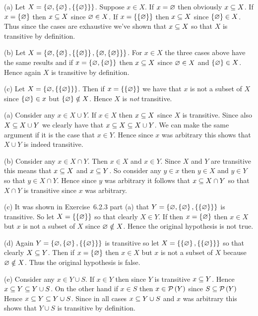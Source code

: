 
\begin{solution}
	(a) Let $X = \braces{\es, \braces{\es}, \braces{\braces{\es}}}$.
    Suppose $x \in X$.
    If $x = \es$ then obviously $x \ss X$.
    If $x = \braces{\es}$ then $x \ss X$ since $\es \in X$.
    If $x  = \braces{\braces{\es}}$ then $x \ss X$ since $\braces{\es} \in X$.
    Thus since the cases are exhaustive we've shown that $x \ss X$ so that $X$ is transitive by definition. \qedsymbol

    (b) Let $X = \braces{\es, \braces{\es}, \braces{\braces{\es}}, \braces{\es, \braces{\es}}}$.
    For $x \in X$ the three cases above have the same results and if $x = \braces{\es, \braces{\es}}$ then $x \ss X$ since $\es \in X$ and $\braces{\es} \in X$.
    Hence again $X$ is transitive by definition. \qedsymbol

    (c) Let $X = \braces{\es, \braces{\braces{\es}}}$.
    Then if $x = \braces{\braces{\es}}$ we have that $x$ is not a subset of $X$ since $\braces{\es} \in x$ but $\braces{\es} \notin X$.
    Hence $X$ is \emph{not} transitive. \qedsymbol
\end{solution}


\begin{solution}
	(a) Consider any $x \in X \cup Y$.
    If $x \in X$ then $x \ss X$ since $X$ is transitive.
    Since also $X \ss X \cup Y$ we clearly have that $x \ss X \ss X \cup Y$.
    We can make the same argument if it is the case that $x \in Y$.
    Hence since $x$ was arbitrary this shows that $X \cup Y$ is indeed transitive. \qedsymbol

    (b) Consider any $x \in X \cap Y$.
    Then $x \in X$ and $x \in Y$.
    Since $X$ and $Y$ are transitive this means that $x \ss X$ and $x \ss Y$.
    So consider any $y \in x$ then $y \in X$ and $y \in Y$ so that $y \in X \cap Y$.
    Hence since $y$ was arbitrary it follows that $x \ss X \cap Y$ so that $X \cap Y$ is transitive since $x$ was arbitrary. \qedsymbol

    (c) It was shown in Exercise~6.2.3 part (a) that $Y = \braces{\es, \braces{\es}, \braces{\braces{\es}}}$ is transitive.
    So let $X = \braces{\braces{\es}}$ so that clearly $X \in Y$.
    If then $x = \braces{\es}$ then $x \in X$ but $x$ is not a subset of $X$ since $\es \notin X$.
    Hence the original hypothesis is not true. \qedsymbol

    (d) Again $Y = \braces{\es, \braces{\es}, \braces{\braces{\es}}}$ is transitive so let $X = \braces{\braces{\es}, \braces{\braces{\es}}}$ so that clearly $X \ss Y$.
    Then if $x = \braces{\es}$ then $x \in X$ but $x$ is not a subset of $X$ because $\es \notin X$.
    Thus the original hypothesis is false. \qedsymbol

    (e) Consider any $x \in Y \cup S$.
    If $x \in Y$ then since $Y$ is transitive $x \ss Y$.
    Hence $x \ss Y \ss Y \cup S$.
    On the other hand if $x \in S$ then $x \in \pset{Y}$ since $S \ss \pset{Y}$
    Hence $x \ss Y \ss Y \cup S$.
    Since in all cases $x \ss Y \cup S$ and $x$ was arbitrary this shows that $Y \cup S$ is transitive by definition. \qedsymbol
\end{solution}


